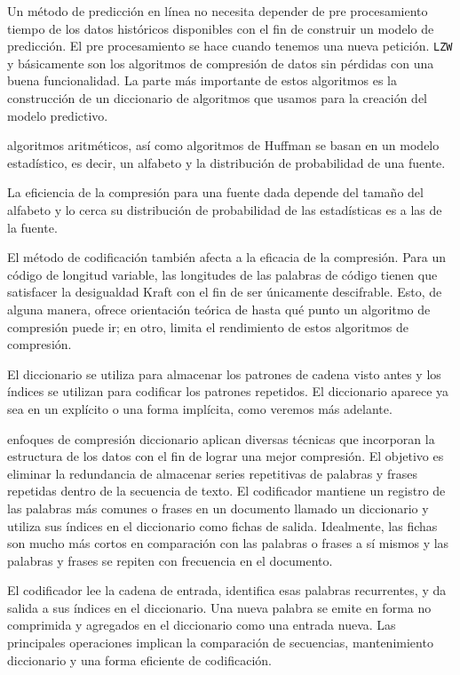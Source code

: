 Un método de predicción en línea no necesita depender de pre procesamiento tiempo de los datos históricos disponibles con el fin de construir un modelo de predicción. El pre procesamiento se hace cuando tenemos una nueva petición. \texttt{LZW} y \lzSieteOcho básicamente son los algoritmos de compresión de datos sin pérdidas con una buena funcionalidad. La parte más importante de estos algoritmos es la construcción de un diccionario de algoritmos que usamos para la creación del modelo predictivo. 






algoritmos aritméticos, así como algoritmos de Huffman se basan en un modelo estadístico, es decir, un alfabeto y la distribución de probabilidad de una fuente. 

La eficiencia de la compresión para una fuente dada depende del tamaño del alfabeto y lo cerca su distribución de probabilidad de las estadísticas es a las de la fuente. 


El método de codificación también afecta a la eficacia de la compresión. 
Para un código de longitud variable, las longitudes de las palabras de código tienen que satisfacer la desigualdad Kraft con el fin de ser únicamente descifrable. Esto, de alguna manera, ofrece orientación teórica de hasta qué punto un algoritmo de compresión puede ir; en otro, limita el rendimiento de estos algoritmos de compresión.

 


El diccionario se utiliza para almacenar los patrones de cadena visto antes y los índices se utilizan para codificar los patrones repetidos. El diccionario aparece ya sea en un explícito o una forma implícita, como veremos más adelante.

enfoques de compresión diccionario aplican diversas técnicas que incorporan la estructura de los datos con el fin de lograr una mejor compresión. El objetivo es eliminar la redundancia de almacenar series repetitivas de palabras y frases repetidas dentro de la secuencia de texto. El codificador mantiene un registro de las palabras más comunes o frases en un documento llamado un diccionario y utiliza sus índices en el diccionario como fichas de salida. Idealmente, las fichas son mucho más cortos en comparación con las palabras o frases a sí mismos y las palabras y frases se repiten con frecuencia en el documento.

El codificador lee la cadena de entrada, identifica esas palabras recurrentes, y da salida a sus índices en el diccionario. Una nueva palabra se emite en forma no comprimida y agregados en el diccionario como una entrada nueva. Las principales operaciones implican la comparación de secuencias, mantenimiento diccionario y una forma eficiente de codificación.

